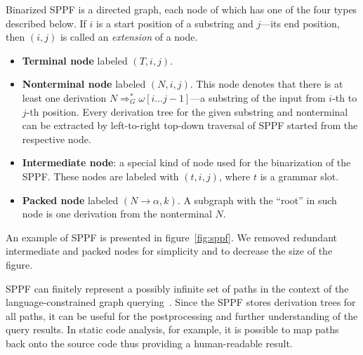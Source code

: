 Binarized SPPF is a directed graph, each node of which has one of the four types described below.
If $i$ is a start position of a substring and $j$---its end position, then $(i,j)$ is called an \emph{extension} of a node.


\begin{itemize}
    \item \textbf{Terminal node} labeled $(T, i, j)$.
    \item \textbf{Nonterminal node} labeled $(N, i, j)$.
    This node denotes that there is at least one derivation $N \Rightarrow^*_G \omega[i \dots j-1]$---a substring of the input from $i$-th to $j$-th position.
    Every derivation tree for the given substring and nonterminal can be extracted by left-to-right top-down traversal of SPPF started from the respective node.
    \item \textbf{Intermediate node}: a special kind of node used for the binarization of the SPPF. These nodes are labeled with $(t,i,j)$, where $t$ is a grammar slot.
    \item \textbf{Packed node} labeled $(N \rightarrow \alpha, k)$.
    A subgraph with the ``root'' in such node is one derivation from the nonterminal $N$.

\end{itemize}


An example of SPPF is presented in figure~\ref{fig:sppf}.
We removed redundant intermediate and packed nodes for simplicity and to decrease the size of the figure.

SPPF can finitely represent a possibly infinite set of paths in the context of the language-constrained graph querying~\cite{Grigorev16}.
Since the SPPF stores derivation trees for all paths, it can be useful for the postprocessing and further understanding of the query results.
In static code analysis, for example, it is possible to map paths back onto the source code thus providing a human-readable result.


